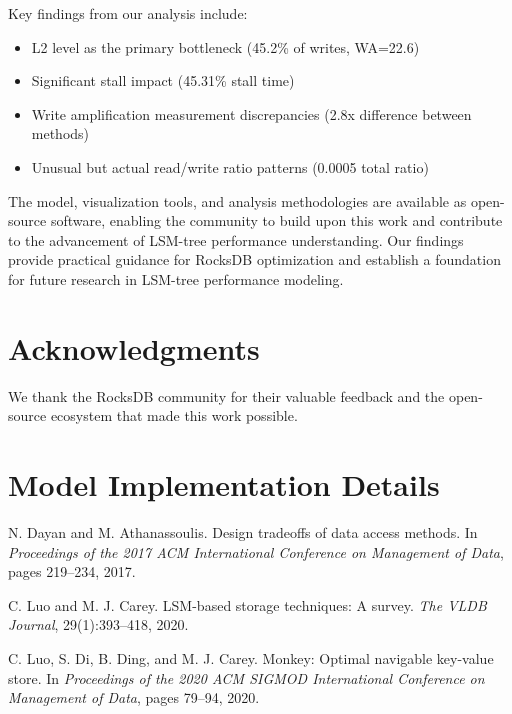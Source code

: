 \documentclass[11pt,twocolumn]{article}
\begin{document}
Key findings from our analysis include:
\begin{itemize}
    \item L2 level as the primary bottleneck (45.2\% of writes, WA=22.6)
    \item Significant stall impact (45.31\% stall time)
    \item Write amplification measurement discrepancies (2.8x difference between methods)
    \item Unusual but actual read/write ratio patterns (0.0005 total ratio)
\end{itemize}

The model, visualization tools, and analysis methodologies are available as open-source software, enabling the community to build upon this work and contribute to the advancement of LSM-tree performance understanding. Our findings provide practical guidance for RocksDB optimization and establish a foundation for future research in LSM-tree performance modeling.

\section*{Acknowledgments}

We thank the RocksDB community for their valuable feedback and the open-source ecosystem that made this work possible.


\appendix

\section{Model Implementation Details}

\begin{thebibliography}{9}
N. Dayan and M. Athanassoulis.
\newblock Design tradeoffs of data access methods.
\newblock In \emph{Proceedings of the 2017 ACM International Conference on Management of Data}, pages 219--234, 2017.

C. Luo and M. J. Carey.
\newblock LSM-based storage techniques: A survey.
\newblock \emph{The VLDB Journal}, 29(1):393--418, 2020.

C. Luo, S. Di, B. Ding, and M. J. Carey.
\newblock Monkey: Optimal navigable key-value store.
\newblock In \emph{Proceedings of the 2020 ACM SIGMOD International Conference on Management of Data}, pages 79--94, 2020.
\end{thebibliography}
\end{document}
